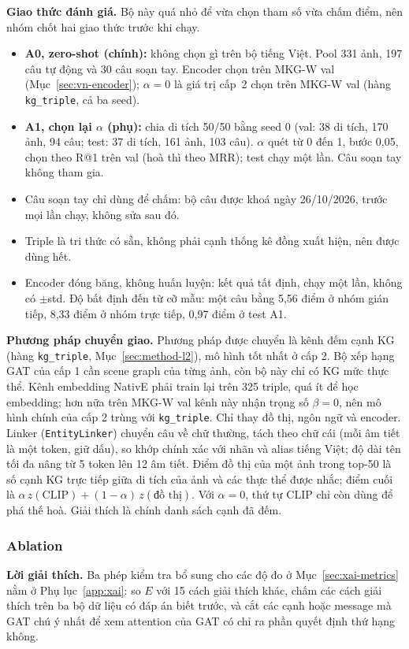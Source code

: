 \textbf{Giao thức đánh giá.}\label{sec:vn-leak} Bộ này quá nhỏ để vừa chọn tham số vừa chấm điểm, nên nhóm chốt hai giao
thức trước khi chạy.
\begin{itemize}
\item \textbf{A0, zero-shot (chính):} không chọn gì trên bộ tiếng Việt. Pool 331 ảnh, 197 câu tự động và 30 câu soạn tay.
  Encoder chọn trên MKG-W val (Mục~\ref{sec:vn-encoder}); $\alpha=0$ là giá trị cấp~2 chọn trên MKG-W val (hàng
  \texttt{kg\_triple}, cả ba seed).
\item \textbf{A1, chọn lại $\alpha$ (phụ):} chia di tích 50/50 bằng seed 0 (val: 38 di tích, 170 ảnh, 94 câu; test: 37 di
  tích, 161 ảnh, 103 câu). $\alpha$ quét từ 0 đến 1, bước 0{,}05, chọn theo R@1 trên val (hoà thì theo MRR); test chạy một
  lần. Câu soạn tay không tham gia.
\item Câu soạn tay chỉ dùng để chấm: bộ câu được khoá ngày 26/10/2026, trước mọi lần chạy, không sửa sau đó.
\item Triple là tri thức có sẵn, không phải cạnh thống kê đồng xuất hiện, nên được dùng hết.
\item Encoder đóng băng, không huấn luyện: kết quả tất định, chạy một lần, không có $\pm$std. Độ bất định đến từ cỡ mẫu:
  một câu bằng 5{,}56 điểm ở nhóm gián tiếp, 8{,}33 điểm ở nhóm trực tiếp, 0{,}97 điểm ở test A1.
\end{itemize}

\textbf{Phương pháp chuyển giao.}\label{sec:vn-method} Phương pháp được chuyển là kênh đếm cạnh KG (hàng \texttt{kg\_triple},
Mục~\ref{sec:method-l2}), mô hình tốt nhất ở cấp 2. Bộ xếp hạng GAT của cấp 1 cần scene graph của từng ảnh, còn bộ này chỉ có
KG mức thực thể. Kênh embedding NativE phải train lại trên 325 triple, quá ít để học embedding; hơn nữa trên MKG-W val kênh
này nhận trọng số $\beta=0$, nên mô hình chính của cấp 2 trùng với \texttt{kg\_triple}. Chỉ thay đồ thị, ngôn ngữ và encoder.
Linker (\texttt{EntityLinker}) chuyển câu về chữ thường, tách theo chữ cái (mỗi âm tiết là một token, giữ dấu), so khớp
chính xác với nhãn và alias tiếng Việt; độ dài tên tối đa nâng từ 5 token lên 12 âm tiết. Điểm đồ thị của một ảnh trong
top-50 là số cạnh KG trực tiếp giữa di tích của ảnh và các thực thể được nhắc; điểm cuối là
$\alpha\, z(\mathrm{CLIP}) + (1-\alpha)\, z(\text{đồ thị})$. Với $\alpha=0$, thứ tự CLIP chỉ còn dùng để phá thế hoà. Giải
thích là chính danh sách cạnh đã đếm.

\subsubsection{Ablation}\label{sec:l3-ablation}
\textbf{Lời giải thích.} Ba phép kiểm tra bổ sung cho các độ đo ở Mục~\ref{sec:xai-metrics} nằm ở Phụ lục~\ref{app:xai}:
so $E$ với 15 cách giải thích khác, chấm các cách giải thích trên ba bộ dữ liệu có đáp án biết trước, và cắt các cạnh hoặc
message mà GAT chú ý nhất để xem attention của GAT có chỉ ra phần quyết định thứ hạng không.

